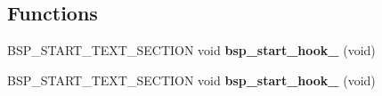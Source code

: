 \subsection*{Functions}
\begin{DoxyCompactItemize}
\item 
\mbox{\label{altera-cyclone-v_2start_2bspstarthooks_8c_a21575f8c638d77f9365131e139ff1839}} 
B\+S\+P\+\_\+\+S\+T\+A\+R\+T\+\_\+\+T\+E\+X\+T\+\_\+\+S\+E\+C\+T\+I\+ON void {\bfseries bsp\+\_\+start\+\_\+hook\+\_} (void)
\item 
\mbox{\label{altera-cyclone-v_2start_2bspstarthooks_8c_ab9cd8c18887a6ef0d92241541490625d}} 
B\+S\+P\+\_\+\+S\+T\+A\+R\+T\+\_\+\+T\+E\+X\+T\+\_\+\+S\+E\+C\+T\+I\+ON void {\bfseries bsp\+\_\+start\+\_\+hook\+\_} (void)
\end{DoxyCompactItemize}
